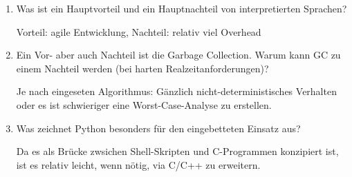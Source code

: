 \begin{enumerate}

  \item Was ist ein Hauptvorteil und ein Hauptnachteil von interpretierten Sprachen?

        Vorteil: agile Entwicklung, Nachteil: relativ viel Overhead

  \item Ein Vor- aber auch Nachteil ist die Garbage Collection. Warum kann GC zu einem Nachteil werden (bei harten Realzeitanforderungen)?

        Je nach eingeseten Algorithmus: Gänzlich nicht-deterministisches
        Verhalten oder es ist schwieriger eine Worst-Case-Analyse zu erstellen.

  \item Was zeichnet Python besonders für den eingebetteten Einsatz aus?

        Da es als Brücke zwsichen Shell-Skripten und C-Programmen konzipiert
        ist, ist es relativ leicht, wenn nötig, via C/C++ zu erweitern.

\end{enumerate}
